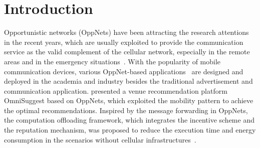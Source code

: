 \section{Introduction}
\label{sec:intro}
Opportunistic networks (OppNets)
have been attracting the research attentions in the recent years,
which are usually exploited to 
provide the communication service
as the valid complement of the cellular network,
especially in the remote areas
and in the emergency situations~\cite{DBLP:journals/tsc/KhalidKKZ14,
DBLP:journals/tmc/ChatzopoulosAKH18,
DBLP:journals/tmc/HanHKMSS12,
DBLP:journals/tmc/LiQJHW014}.
With the popularity of mobile communication devices,
various OppNet-based 
applications~\cite{DBLP:journals/tsc/KhalidKKZ14,
DBLP:journals/tmc/ChatzopoulosAKH18} are designed and deployed
in the academia and industry
besides the traditional advertisement and communication application.
\cite{DBLP:journals/tsc/KhalidKKZ14} presented 
a venue recommendation platform OmniSuggest based on OppNets,
which exploited the mobility pattern 
to achieve the optimal recommendations.
Inspired by the message forwarding in OppNets,
the computation offloading framework,
which integrates the incentive scheme and the reputation mechanism,
was proposed to reduce the execution time and energy consumption
in the scenarios without cellular infrastructures~\cite{DBLP:journals/tmc/ChatzopoulosAKH18}.

